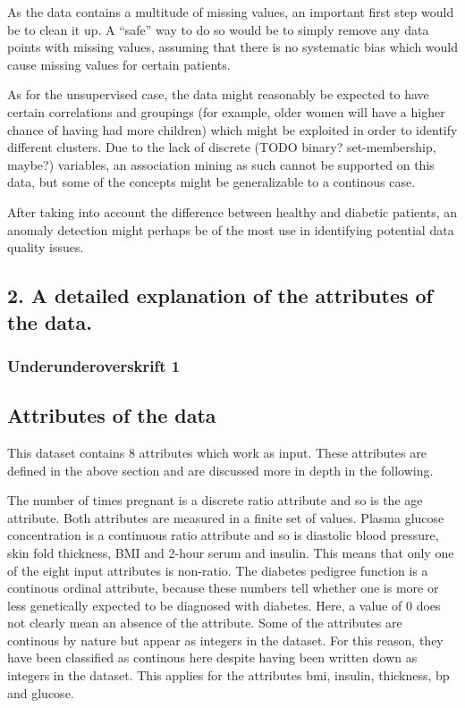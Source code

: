 As the data contains a multitude of missing values,
an important first step would be to clean it up.
A ``safe'' way to do so would be to simply remove any data points
with missing values,
assuming that there is no systematic bias
which would cause missing values for certain patients.

As for the unsupervised case,
the data might reasonably be expected to have certain correlations
and groupings
(for example, older women will have a higher chance of having had more children)
which might be exploited
in order to identify different clusters.
Due to the lack of discrete (TODO binary? set-membership, maybe?) variables,
an association mining as such cannot be supported on this data,
but some of the concepts might be generalizable to a continous case.

After taking into account the difference between healthy and diabetic patients,
an anomaly detection might perhaps be of the most use in identifying
potential data quality issues.

\subsection{2. A detailed explanation of the attributes of the data.}

\subsubsection{Underunderoverskrift 1}


\subsection{Attributes of the data}
This dataset contains 8 attributes which work as input. These attributes are defined in
the above section and are discussed more in depth in the following.

The number of times pregnant is a discrete ratio attribute and so is
the age attribute. Both attributes are measured in a finite set of values.
Plasma glucose concentration is a continuous ratio attribute
and so is diastolic blood pressure, skin fold thickness, BMI and 2-hour serum and
insulin. This means that only one of the eight input attributes is non-ratio.
The diabetes pedigree function is a continous ordinal attribute, because these
numbers tell whether one is more or less genetically expected to be diagnosed
with diabetes. Here, a value of 0 does not clearly mean an absence of the attribute.
Some of the attributes are continous by nature but appear as integers in the dataset.
For this reason, they have been classified as continous here despite having been written
down as integers in the dataset. This applies for the attributes bmi, insulin,
thickness, bp and glucose.
\bigskip

